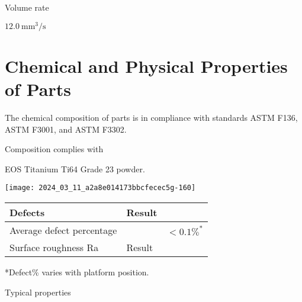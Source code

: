 \documentclass[10pt]{article}
\begin{document}
Volume rate

$12.0 \mathrm{~mm}^{3} / \mathrm{s}$

\section*{Chemical and Physical Properties of Parts}
The chemical composition of parts is in compliance with standards ASTM F136, ASTM F3001, and ASTM F3302.

Composition complies with

EOS Titanium Ti64 Grade 23 powder.

\begin{center}
\texttt{[image: 2024\_03\_11\_a2a8e014173bbcfecec5g-160]}
\end{center}

\begin{center}
\begin{tabular}{llc}
\hline
Defects & Result &  \\
\hline
Average defect percentage &  & $<0.1 \%^{*}$ \\
\hline
Surface roughness Ra & Result &  \\
\hline
\end{tabular}
\end{center}

*Defect\% varies with platform position.

Typical properties
\end{document}
